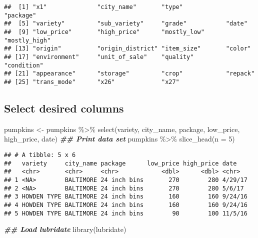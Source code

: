 \documentclass[
]{article}
\newenvironment{Shaded}{\begin{snugshade}}{\end{snugshade}}
\newcommand{\AttributeTok}[1]{\textcolor[rgb]{0.77,0.63,0.00}{#1}}
\newcommand{\DecValTok}[1]{\textcolor[rgb]{0.00,0.00,0.81}{#1}}
\newcommand{\DocumentationTok}[1]{\textcolor[rgb]{0.56,0.35,0.01}{\textbf{\textit{#1}}}}
\newcommand{\FunctionTok}[1]{\textcolor[rgb]{0.00,0.00,0.00}{#1}}
\newcommand{\NormalTok}[1]{#1}
\newcommand{\OtherTok}[1]{\textcolor[rgb]{0.56,0.35,0.01}{#1}}
\newcommand{\SpecialCharTok}[1]{\textcolor[rgb]{0.00,0.00,0.00}{#1}}
\begin{document}
\begin{verbatim}
##  [1] "x1"              "city_name"       "type"            "package"        
##  [5] "variety"         "sub_variety"     "grade"           "date"           
##  [9] "low_price"       "high_price"      "mostly_low"      "mostly_high"    
## [13] "origin"          "origin_district" "item_size"       "color"          
## [17] "environment"     "unit_of_sale"    "quality"         "condition"      
## [21] "appearance"      "storage"         "crop"            "repack"         
## [25] "trans_mode"      "x26"             "x27"
\end{verbatim}

\hypertarget{select-desired-columns}{%
\subsection{Select desired columns}\label{select-desired-columns}}

\begin{Shaded}
\begin{Highlighting}[]
\NormalTok{pumpkins }\OtherTok{\textless{}{-}}\NormalTok{ pumpkins }\SpecialCharTok{\%\textgreater{}\%} \FunctionTok{select}\NormalTok{(variety, city\_name, package, low\_price, high\_price, date)}
\DocumentationTok{\#\# Print data set}
\NormalTok{pumpkins }\SpecialCharTok{\%\textgreater{}\%} \FunctionTok{slice\_head}\NormalTok{(}\AttributeTok{n =} \DecValTok{5}\NormalTok{)}
\end{Highlighting}
\end{Shaded}

\begin{verbatim}
## # A tibble: 5 x 6
##   variety     city_name package      low_price high_price date   
##   <chr>       <chr>     <chr>            <dbl>      <dbl> <chr>  
## 1 <NA>        BALTIMORE 24 inch bins       270        280 4/29/17
## 2 <NA>        BALTIMORE 24 inch bins       270        280 5/6/17 
## 3 HOWDEN TYPE BALTIMORE 24 inch bins       160        160 9/24/16
## 4 HOWDEN TYPE BALTIMORE 24 inch bins       160        160 9/24/16
## 5 HOWDEN TYPE BALTIMORE 24 inch bins        90        100 11/5/16
\end{verbatim}

\begin{Shaded}
\begin{Highlighting}[]
\DocumentationTok{\#\# Load lubridate}
\FunctionTok{library}\NormalTok{(lubridate)}
\end{Highlighting}
\end{Shaded}
\end{document}

